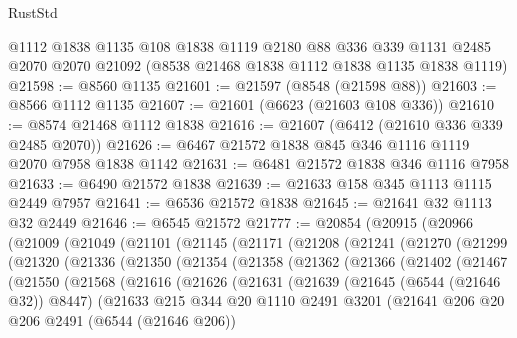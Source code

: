\begin{lexlean}{RustStd}
\begin{coremodule}
    @1112
    @1838
    @1135
    @108
    @1838
    @1119
    @2180
    @88
    @336
    @339
    @1131
    @2485
    @2070
    @2070
    @21092
    (@8538 @21468 @1838 @1112 @1838 @1135 @1838 @1119)
@21598 := @8560 @1135
@21601 := @21597 (@8548 (@21598 @88))
@21603 := @8566 @1112 @1135
@21607 := @21601 (@6623 (@21603 @108 @336))
@21610 := @8574 @21468 @1112 @1838
@21616 := @21607 (@6412 (@21610 @336 @339 @2485 @2070))
@21626 := @6467 @21572 @1838 @845 @346 @1116 @1119 @2070 @7958 @1838 @1142
@21631 := @6481 @21572 @1838 @346 @1116 @7958
@21633 := @6490 @21572 @1838
@21639 := @21633 @158 @345 @1113 @1115 @2449 @7957
@21641 := @6536 @21572 @1838
@21645 := @21641 @32 @1113 @32 @2449
@21646 := @6545 @21572
@21777 := @20854
    (@20915
      (@20966
        (@21009
          (@21049
            (@21101
              (@21145
                (@21171
                  (@21208
                    (@21241
                      (@21270
                        (@21299
                          (@21320
                            (@21336
                              (@21350
                                (@21354
                                  (@21358
                                    (@21362
                                      (@21366
                                        (@21402
                                          (@21467
                                            (@21550
                                              (@21568
                                                (@21616
                                                  (@21626
                                                    (@21631
                                                      (@21639
                                                        (@21645 (@6544 (@21646 @32)) @8447)
                                                        (@21633
                                                          @215
                                                          @344
                                                          @20
                                                          @1110
                                                          @2491
                                                          @3201
                                                          (@21641
                                                            @206
                                                            @20
                                                            @206
                                                            @2491
                                                            (@6544 (@21646 @206))

\end{coremodule}
\end{lexlean}
